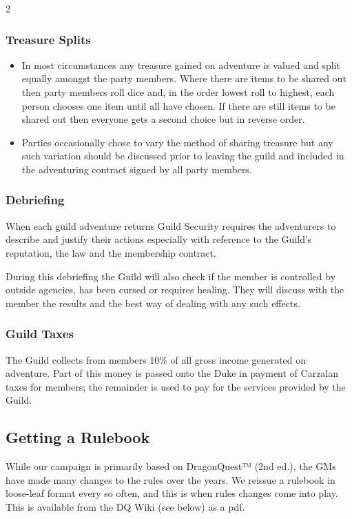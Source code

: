 \begin{multicols}{2}
\subsubsection{Treasure Splits}

\begin{itemize}
\item In most circumstances any treasure gained on adventure is valued
  and split equally amongst the party members. Where there are items
  to be shared out then party members roll dice and, in the order
  lowest roll to highest, each person chooses one item until all have
  chosen. If there are still items to be shared out then everyone gets
  a second choice but in reverse order.
  
\item Parties occasionally chose to vary the method of sharing
  treasure but any such variation should be discussed prior to leaving
  the guild and included in the adventuring contract signed by all
  party members.
\end{itemize}

\subsubsection{Debriefing}

When each guild adventure returns Guild Security requires the
adventurers to describe and justify their actions especially with
reference to the Guild’s reputation, the law and the membership
contract.

During this debriefing the Guild will also check if the member is
controlled by outside agencies, has been cursed or requires
healing. They will discuss with the member the results and the best
way of dealing with any such effects.

\subsubsection{Guild Taxes}

The Guild collects from members 10\% of all gross income generated on
adventure. Part of this money is passed onto the Duke in payment of
Carzalan taxes for members; the remainder is used to pay for the
services provided by the Guild.

\subsection{Getting a Rulebook}

While our campaign is primarily based on DragonQuest™ (2nd ed.), the
GMs have made many changes to the rules over the years. We reissue a
rulebook in loose-leaf format every so often, and this is when rules
changes come into play. This is available from the DQ Wiki (see below)
as a pdf.


\end{multicols}
